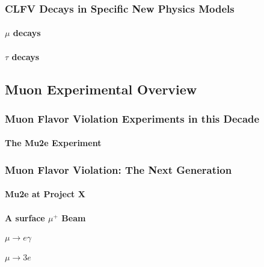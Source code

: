 \subsubsection{CLFV Decays in Specific New Physics Models}


\paragraph{$\mu$ decays}

\paragraph{$\tau$ decays}

\subsection{Muon Experimental Overview}\label{sec:cl:muexp}

\subsubsection{Muon Flavor Violation Experiments in this Decade}
\paragraph{The Mu2e Experiment}


\subsubsection{Muon Flavor Violation: The Next Generation}

\paragraph{Mu2e at Project X}


\paragraph{A surface $\mu^+$ Beam}


\paragraph{$\mu \to e \gamma$}


\paragraph{$\mu \to 3e$}

